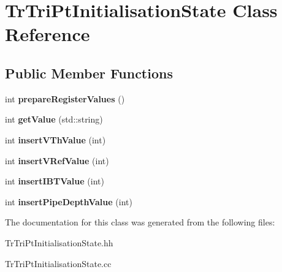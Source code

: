 \hypertarget{classTrTriPtInitialisationState}{\section{Tr\-Tri\-Pt\-Initialisation\-State Class Reference}
\label{classTrTriPtInitialisationState}
}
\subsection*{Public Member Functions}
\begin{DoxyCompactItemize}
\item 
\hypertarget{classTrTriPtInitialisationState_aefa597fdba852452843bb1323bce6fa0}{int {\bfseries prepare\-Register\-Values} ()}\label{classTrTriPtInitialisationState_aefa597fdba852452843bb1323bce6fa0}

\item 
\hypertarget{classTrTriPtInitialisationState_ac5812d4d93d6a2b003099be3dda0b5a6}{int {\bfseries get\-Value} (std\-::string)}\label{classTrTriPtInitialisationState_ac5812d4d93d6a2b003099be3dda0b5a6}

\item 
\hypertarget{classTrTriPtInitialisationState_a08f5ce6a5c608a354243fa8c38d636c2}{int {\bfseries insert\-V\-Th\-Value} (int)}\label{classTrTriPtInitialisationState_a08f5ce6a5c608a354243fa8c38d636c2}

\item 
\hypertarget{classTrTriPtInitialisationState_ad01ef833ceb56cf8552314728951bef3}{int {\bfseries insert\-V\-Ref\-Value} (int)}\label{classTrTriPtInitialisationState_ad01ef833ceb56cf8552314728951bef3}

\item 
\hypertarget{classTrTriPtInitialisationState_a1226aa71ed0a62c5b6286a48876ae45e}{int {\bfseries insert\-I\-B\-T\-Value} (int)}\label{classTrTriPtInitialisationState_a1226aa71ed0a62c5b6286a48876ae45e}

\item 
\hypertarget{classTrTriPtInitialisationState_a9049e07cecd4776da3c37d58c186fed7}{int {\bfseries insert\-Pipe\-Depth\-Value} (int)}\label{classTrTriPtInitialisationState_a9049e07cecd4776da3c37d58c186fed7}

\end{DoxyCompactItemize}


The documentation for this class was generated from the following files\-:\begin{DoxyCompactItemize}
\item 
Tr\-Tri\-Pt\-Initialisation\-State.\-hh\item 
Tr\-Tri\-Pt\-Initialisation\-State.\-cc\end{DoxyCompactItemize}
